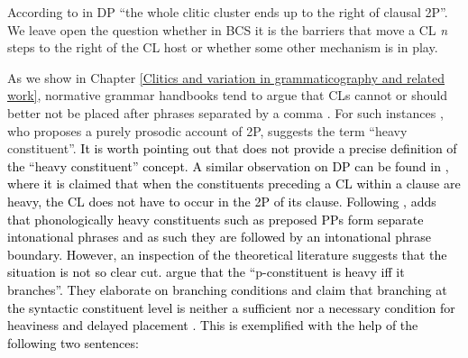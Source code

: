  According to \citet[196]{ZimmerlingKosta13} in DP ``the whole clitic cluster ends up to the right of clausal 2P''. We leave open the question whether in BCS it is the barriers that move a CL \textit{n} steps to the right of the CL host or whether some other mechanism is in play.

As we show in Chapter \ref{Clitics and variation in grammaticography and related work}, normative grammar handbooks tend to argue that CLs cannot or should better not be placed after phrases separated by a comma \citep[cf.][132]{Reinkowski08}. For such instances \citet[435]{RadanovicKocic96}, who proposes a purely prosodic account of 2P, suggests the term ``heavy constituent''. \textcolor{black}{It is worth pointing out that \citet{RadanovicKocic96} does not provide a precise definition of the ``heavy constituent'' concept. A similar observation on DP can be found in \citet[264]{Boskovic95}, where it is claimed that when the constituents preceding a CL within a clause are heavy, the CL does not have to occur in the 2P of its clause. Following \citet{Schutze94}, \citet[264]{Boskovic95} adds that phonologically heavy constituents such as preposed PPs form separate intonational phrases and as such they are followed by an intonational phrase boundary. 
However, an inspection of the theoretical literature suggests that the situation is not so clear cut. \citet[373]{InkelasZec90} argue that the ``p-constituent is heavy iff it branches''. They elaborate on branching conditions and claim that branching at the syntactic constituent level is neither a sufficient nor a necessary condition for heaviness and delayed placement \citep[374f]{InkelasZec90}. This is exemplified with the help of the following two sentences:}

\begin{exe}\ex
\begin{xlist}
\end{xlist}
\end{exe}


